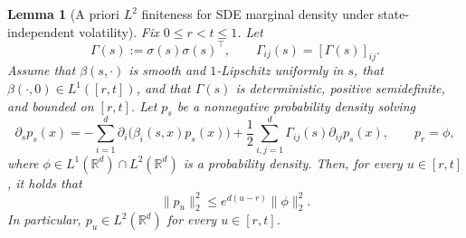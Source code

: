 \documentclass{article}
\newtheorem{lem}[thm]{Lemma}
\newcommand{\1}{\mathbbm{1}}
\numberwithin{equation}{section}
\begin{document}
\begin{lem}[A priori $L^2$ finiteness for SDE marginal density under state-independent volatility]\label{lem:c2}
Fix $0 \le r < t \le 1$. Let
\[
\Gamma(s) := \sigma(s)\sigma(s)^\top, \qquad \Gamma_{ij}(s) = [\Gamma(s)]_{ij}.
\]
Assume that $\beta(s,\cdot)$ is smooth and $1$-Lipschitz uniformly in $s$,
that $\beta(\cdot,0)\in L^1([r,t])$, and that $\Gamma(s)$ is deterministic,
positive semidefinite, and bounded on $[r,t]$. Let $p_s$ be a nonnegative
probability density solving
\[
\partial_s p_s(x)
=
-\sum_{i=1}^d \partial_i\bigl(\beta_i(s,x)p_s(x)\bigr)
+
\frac12\sum_{i,j=1}^d \Gamma_{ij}(s)\partial_{ij}p_s(x),
\qquad p_r=\phi,
\]
where $\phi\in L^1(\mathbb R^d)\cap L^2(\mathbb R^d)$ is a probability density.
Then, for every $u\in[r,t]$, it holds that
\[
\|p_u\|_2^2
\le
e^{d(u-r)}\|\phi\|_2^2.
\]
In particular, $p_u\in L^2(\mathbb R^d)$ for every $u\in[r,t]$.
\end{lem}
\end{document}
